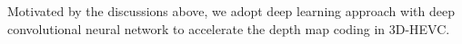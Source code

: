 Motivated by the discussions above, we adopt deep learning approach with
deep convolutional neural network to accelerate the depth map coding in
3D-HEVC.



%
%
%
%
%
